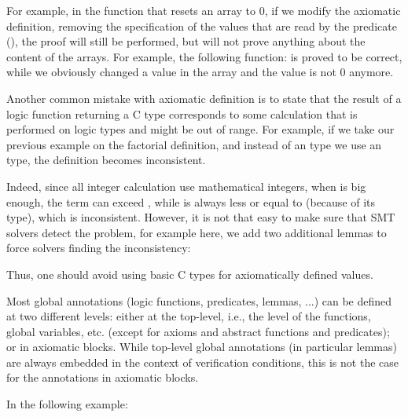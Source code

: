 For example, in the function that resets an array to 0, if we modify the
axiomatic definition, removing the specification of the values that are
read by the predicate (), the proof
will still be performed, but will not prove anything about the content
of the arrays. For example, the following function:
is proved to be correct, while we obviously changed a value in the array
and the value is not 0 anymore.




Another common mistake with axiomatic definition is to state that the result of
a logic function returning a C type corresponds to some calculation that is
performed on logic types and might be out of range. For example, if we take
our previous example on the factorial definition, and instead of an
 type we use an  type, the definition
becomes inconsistent.



Indeed, since all integer calculation use mathematical integers, when
 is big enough, the term  can
exceed , while  is always less or
equal to  (because of its type), which is inconsistent.
However, it is not that easy to make sure that SMT solvers detect the problem,
for example here, we add two additional lemmas to force solvers finding the
inconsistency:






Thus, one should avoid using basic C types for axiomatically defined values.




Most global annotations (logic functions, predicates, lemmas, ...) can be
defined at two different levels: either at the top-level, i.e., the level of the
functions, global variables, etc. (except for axioms and abstract functions and
predicates); or in axiomatic blocks. While top-level global annotations (in
particular lemmas) are always embedded in the context of verification
conditions, this is not the case for the annotations in axiomatic blocks.


In the following example:




